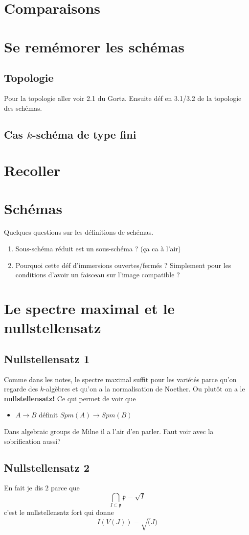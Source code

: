 \documentclass[a4paper,12pt]{book}
\newcommand{\p}{\mathfrak{p}}
\theoremstyle{plain}
\theoremstyle{definition}
\theoremstyle{remark}
\begin{document}
\chapter{Comparaisons}
\chapter{Se remémorer les schémas}
\section{Topologie}
 Pour la topologie aller voir 2.1 du Gortz. Ensuite déf en 3.1/3.2
 de la topologie des schémas. 
\section{Cas $k$-schéma de type fini}

\chapter{Recoller}


\chapter{Schémas}
Quelques questions sur les définitions de schémas.
\begin{enumerate}
    \item Sous-schéma réduit est un sous-schéma ? (ça ca à l'air)
    \item Pourquoi cette déf d'immersions ouvertes/fermés ?
	Simplement pour les conditions d'avoir un faisceau
	sur l'image compatible ?
\end{enumerate}

\chapter{Le spectre maximal et le nullstellensatz}
\section{Nullstellensatz 1}
Comme dans les notes, le spectre maximal suffit pour 
les variétés parce qu'on regarde des $k$-algèbres et
qu'on a la normalisation de Noether. Ou plutôt on a le 
\textbf{nullstellensatz!} Ce qui permet de voir que 
\begin{itemize}
    \item $A\to B$ définit $Spm(A)\to Spm(B)$
\end{itemize}
Dans algebraic groups de Milne il a l'air d'en parler. Faut voir
avec la sobrification aussi?
\section{Nullstellensatz 2}
En fait je dis $2$ parce que 
\[\bigcap_{I\subset \p} \p =\sqrt{I}\]
c'est le nullstellensatz fort qui donne 
\[I(V(J))=\sqrt(J)\]

\printbibliography
\end{document}
